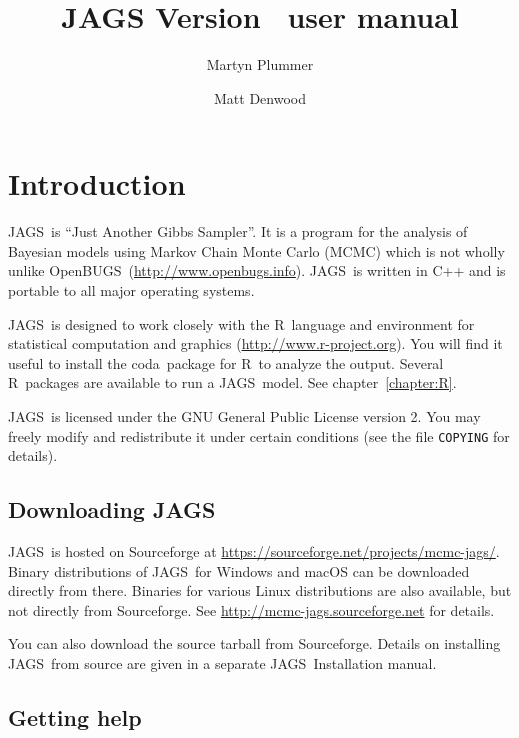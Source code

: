 \documentclass[11pt, a4paper, titlepage]{report}
\newcommand{\JAGS}{\textsf{JAGS}}
\newcommand{\OpenBUGS}{\textsf{OpenBUGS}}
\newcommand{\R}{\textsf{R}}
\newcommand{\CODA}{\textsf{coda}}
\begin{document}


\title{JAGS Version \jagsversion\ user manual}
\author{Martyn Plummer \and Matt Denwood}
\maketitle

\tableofcontents

\chapter{Introduction}

\JAGS\ is ``Just Another Gibbs Sampler''.  It is a program for the
analysis of Bayesian models using Markov Chain Monte Carlo (MCMC)
which is not wholly unlike
\OpenBUGS\ (\url{http://www.openbugs.info}). \JAGS\ is written in
C++ and is portable to all major operating systems. %

\JAGS\ is designed to work closely with the \R\ language and
environment for statistical computation and graphics
(\url{http://www.r-project.org}).  You will find it useful to install
the \CODA\ package for \R\ to analyze the output. Several \R\ packages
are available to run a \JAGS\ model. See chapter~\ref{chapter:R}.

\JAGS\ is licensed under the GNU General Public License version 2. You
may freely modify and redistribute it under certain conditions (see
the file \texttt{COPYING} for details).

\section{Downloading \JAGS}

\JAGS\ is hosted on Sourceforge at
\url{https://sourceforge.net/projects/mcmc-jags/}. Binary
distributions of \JAGS\ for Windows and macOS can be downloaded
directly from there.  Binaries for various Linux distributions are
also available, but not directly from Sourceforge. See
\url{http://mcmc-jags.sourceforge.net} for details.

You can also download the source tarball from Sourceforge. Details
on installing \JAGS\ from source are given in a separate \JAGS\
Installation manual.

\section{Getting help}
\label{section:help}
\end{document}
